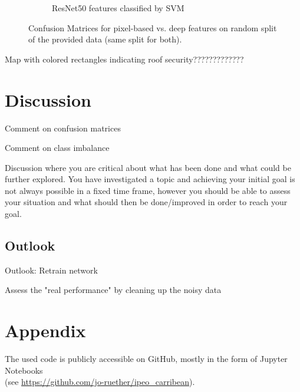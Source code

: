 \documentclass[11pt]{article}
\begin{document}
\begin{figure}
\begin{subfigure}[t]{.5\textwidth}
			\caption{ResNet50 features classified by SVM}
		\end{subfigure}
	\caption{Confusion Matrices for pixel-based vs. deep features on random split of the provided data (same split for both).}
	\label{fig:pixel_based_cm}
	\end{figure}
	
	Map with colored rectangles indicating roof security?????????????
	
	
	\section{Discussion}
	\label{sec:discussion}
	
	Comment on confusion matrices
	
	Comment on class imbalance
	
	
	Discussion where you are critical about what has been done and what could be further explored. You have investigated a topic and achieving your initial goal is not always possible in a fixed time frame, however you should be able to assess your situation and what should then be done/improved in order to reach your goal.
	
	\subsection{Outlook}
	Outlook: Retrain network
	
	Assess the "real performance" by cleaning up the noisy data
	
	\section{Appendix}

	The used code is publicly accessible on GitHub, mostly in the form of Jupyter Notebooks \\
	(see \url{https://github.com/jo-ruether/ipeo_carribean}).
	
	
	 
	
\end{document}
